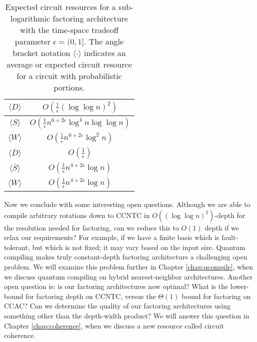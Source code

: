 \begin{table}[htb!]
\begin{center}
\begin{tabular}{|c|c|}
\hline
$\langle D \rangle$ & $O(\frac{1}{\epsilon}(\log\log n)^2)$ \\
\hline
$\langle S \rangle$ & $O(\frac{1}{\epsilon}n^{6 + 2\epsilon}\log^4 n\log\log n)$ \\
\hline
$\langle W \rangle$ & $O(\frac{1}{\epsilon}n^{6 + 2\epsilon}\log^2 n)$ \\
\hline
$\langle \overline{D} \rangle$ & $O(\frac{1}{\epsilon})$ \\
\hline
$\langle \overline{S} \rangle$ & $O(\frac{1}{\epsilon}n^{4+2\epsilon}\log n)$ \\
\hline
$\langle \overline{W} \rangle$ & $O(\frac{1}{\epsilon}n^{4+2\epsilon}\log n)$ \\
\hline
\end{tabular}
\caption[Expected circuit resources for a sub-logarithmic factoring architecture.]
{Expected circuit resources for a sub-logarithmic factoring architecture with
the time-space tradeoff parameter $\epsilon = (0,1]$.
The angle bracket notation $\langle \cdot \rangle$ indicates an average
or expected circuit resource for a circuit with probabilistic portions.}
\label{tab:sublog-resources}
\end{center}
\end{table}
%
Now we conclude with some interesting open questions.
Although we are able to compile arbitrary rotations down to \textsf{CCNTC} in
$O((\log \log n)^2)$-depth
for the resolution needed for factoring, can we reduce this to $O(1)$ depth
if we relax our
requirements? For example, if we have a finite basis which is fault-tolerant,
but which is not fixed;
it may vary based on the input size. Quantum compiling makes truly
constant-depth factoring architecture a challenging
open problem. We will examine this problem further
in Chapter \ref{chap:qcompile},
when we discuss quantum compiling on
hybrid nearest-neighbor architectures.
Another open question is: is our factoring architectures now optimal?
What is the lower-bound for factoring depth on \textsf{CCNTC}, versus the
$\Theta(1)$ bound for factoring on \textsf{CCAC}?
Can we determine the quality of our factoring architectures using something
other than the depth-width product?
We will answer this question in Chapter \ref{chap:coherence}, when we discuss
a new resource called
circuit coherence. 



